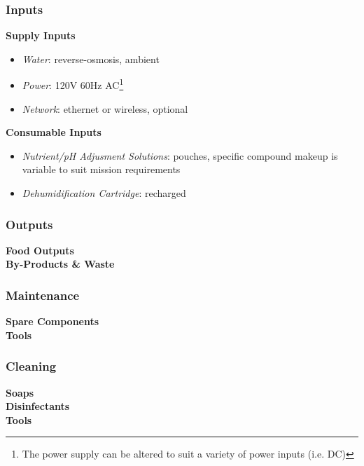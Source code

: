 \clearpage

\subsubsection{Inputs}

\textbf{Supply Inputs}
\begin{itemize}
    \item \textit{Water}: reverse-osmosis, ambient
    \item \textit{Power}: 120V 60Hz AC\footnote{The power supply can be altered to suit a variety of power inputs (i.e. DC)}
    \item \textit{Network}: ethernet or wireless, optional
\end{itemize}

\textbf{Consumable Inputs}
\begin{itemize}
    \item \textit{Nutrient/pH Adjusment Solutions}: pouches, specific compound makeup is variable to suit mission requirements
    \item \textit{Dehumidification Cartridge}: recharged
\end{itemize}

\subsubsection{Outputs}

\textbf{Food Outputs}\\


\textbf{By-Products \& Waste}\\


\subsubsection{Maintenance}

\textbf{Spare Components}\\


\textbf{Tools}\\


\subsubsection{Cleaning}

\textbf{Soaps}\\


\textbf{Disinfectants}\\


\textbf{Tools}\\

